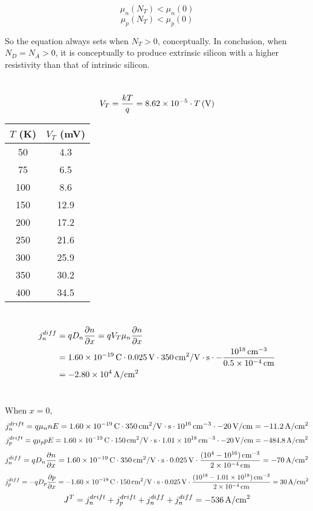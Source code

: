 \documentclass{article}
\newcommand{\unit}[1]{{\rm\,#1}}
\begin{document}
$$\mu_n(N_T)<\mu_n(0)$$
$$\mu_p(N_T)<\mu_p(0)$$

So the equation always sets when $N_T>0$, conceptually. In conclusion, when $N_D=N_A>0$, it is conceptually to produce extrinsic silicon with a higher resistivity than that of intrinsic silicon.

\section{}
$$V_T=\frac{kT}{q}=8.62\times10^{-5}\cdot T\unit{(V)}$$
\begin{center}
\begin{tabular}{|c|c|}
\hline
$T$ (K) & $V_T$ (mV) \\\hline
50 & 4.3\\\hline
75 & 6.5\\\hline
100 & 8.6\\\hline
150 & 12.9\\\hline
200 & 17.2\\\hline
250 & 21.6\\\hline
300 & 25.9\\\hline
350 & 30.2\\\hline
400 & 34.5\\\hline
\end{tabular}
\end{center}

\section{}
\begin{align*}
j_n^{diff}&=qD_n\frac{\partial n}{\partial x}=qV_T\mu_n\frac{\partial n}{\partial x}\\
&=1.60\times10^{-19}\unit{C}\cdot0.025\unit{V}\cdot350\unit{cm^2/V\cdot s}\cdot-\frac{10^{18}\unit{cm^{-3}}}{0.5\times10^{-4}\unit{cm}}\\
&=-2.80\times10^{4}\unit{A/cm^2}
\end{align*}


\section{}
When $x=0$,
$$j_n^{drift}=q\mu_nnE=1.60\times10^{-19}\unit{C}\cdot350\unit{cm^2/V\cdot s}\cdot10^{16}\unit{cm^{-3}}\cdot-20\unit{V/cm}=-11.2\unit{A/cm^2}$$
$$j_p^{drift}=q\mu_ppE=1.60\times10^{-19}\unit{C}\cdot150\unit{cm^2/V\cdot s}\cdot1.01\times10^{18}\unit{cm^{-3}}\cdot-20\unit{V/cm}=-484.8\unit{A/cm^2}$$
$$j_n^{diff}=qD_n\frac{\partial n}{\partial x}=1.60\times10^{-19}\unit{C}\cdot350\unit{cm^2/V\cdot s}\cdot0.025\unit{V}\cdot\frac{(10^4-10^{16})\unit{cm^{-3}}}{2\times10^{-4}\unit{cm}}=-70\unit{A/cm^2}$$
$$j_p^{diff}=-qD_p\frac{\partial p}{\partial x}=-1.60\times10^{-19}\unit{C}\cdot150\unit{cm^2/V\cdot s}\cdot0.025\unit{V}\cdot\frac{(10^{18}-1.01\times10^{18})\unit{cm^{-3}}}{2\times10^{-4}\unit{cm}}=30\unit{A/cm^2}$$
$$J^T=j_n^{drift}+j_p^{drift}+j_n^{diff}+j_n^{diff}=-536\unit{A/cm^2}$$
\end{document}
